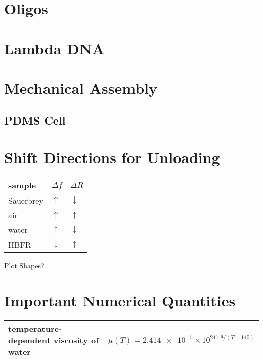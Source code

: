 \documentclass[a4paper]{article}
\begin{document}
\section{Oligos}

\section{Lambda DNA}

\section{Mechanical Assembly}
\subsection{PDMS Cell}

\section{Shift Directions for Unloading}
\begin{tabular}{lll}
  \toprule
  sample    & $\Delta f$   & $\Delta R$   \\
  \midrule
  Sauerbrey & $\uparrow$   & $\downarrow$ \\
  air       & $\uparrow$   & $\uparrow$   \\
  water     & $\uparrow$   & $\downarrow$ \\
  HBFR      & $\downarrow$ & $\uparrow$   \\
  \bottomrule
\end{tabular}

Plot Shapes?
\section{Important Numerical Quantities}
\begin{table}
  \centering
  \begin{tabularx}{\textwidth}{ l l }
    \toprule
    temperature-dependent viscosity of water & $\mu(T)=\num{2.414e-5}\times 10^{247.8/(T-140)}$ \\
    \bottomrule
  \end{tabularx}
\end{table}
\end{document}
